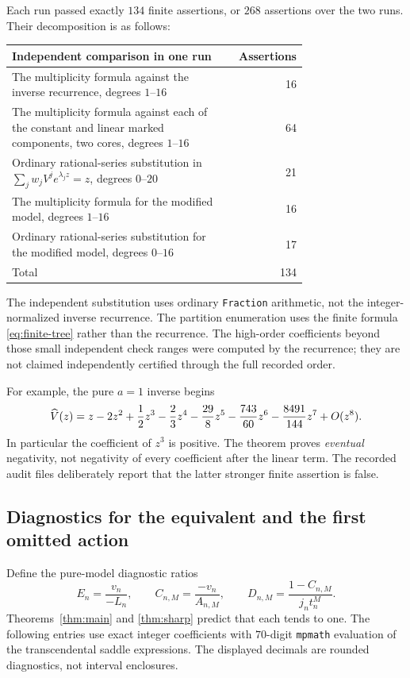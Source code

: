 \documentclass[11pt,a4paper]{article}
\numberwithin{equation}{section}
\theoremstyle{definition}
\theoremstyle{remark}
\begin{document}
Each run passed exactly $134$ finite assertions, or $268$ assertions over
the two runs. Their decomposition is as follows:
\begin{center}
\begin{tabular}{p{0.74\linewidth}r}
\toprule
Independent comparison in one run & Assertions\\
\midrule
The multiplicity formula against the inverse recurrence, degrees $1$--$16$
 &16\\
The multiplicity formula against each of the constant and linear marked
components, two cores, degrees $1$--$16$ &64\\
Ordinary rational-series substitution in
$\sum_jw_jV^j e^{\lambda_jz}=z$, degrees $0$--$20$ &21\\
The multiplicity formula for the modified model, degrees $1$--$16$ &16\\
Ordinary rational-series substitution for the modified model,
degrees $0$--$16$ &17\\
\midrule
Total &134\\
\bottomrule
\end{tabular}
\end{center}
The independent substitution uses ordinary \texttt{Fraction} arithmetic,
not the integer-normalized inverse recurrence. The partition enumeration
uses the finite formula \eqref{eq:finite-tree} rather than the recurrence.
The high-order coefficients beyond those small independent check ranges
were computed by the recurrence; they are not claimed independently
certified through the full recorded order.

For example, the pure $a=1$ inverse begins
\begin{equation}
 \widehat V(z)=z-2z^2+\frac12z^3-\frac23z^4-\frac{29}{8}z^5
                 -\frac{743}{60}z^6-\frac{8491}{144}z^7+O(z^8).
 \label{eq:first-coefficients}
\end{equation}
In particular the coefficient of $z^3$ is positive. The theorem proves
\emph{eventual} negativity, not negativity of every coefficient after the
linear term. The recorded audit files deliberately report that the latter
stronger finite assertion is false.

\subsection{Diagnostics for the equivalent and the first omitted action}

Define the pure-model diagnostic ratios
\[
 E_n=\frac{v_n}{-L_n},\qquad
 C_{n,M}=\frac{-v_n}{A_{n,M}},\qquad
 D_{n,M}=\frac{1-C_{n,M}}{j_nt_n^M}.
\]
Theorems~\ref{thm:main} and \ref{thm:sharp} predict that each tends to
one. The following entries use exact integer coefficients with $70$-digit
\texttt{mpmath} evaluation of the transcendental saddle expressions.
The displayed decimals are rounded diagnostics, not interval enclosures.
\end{document}

